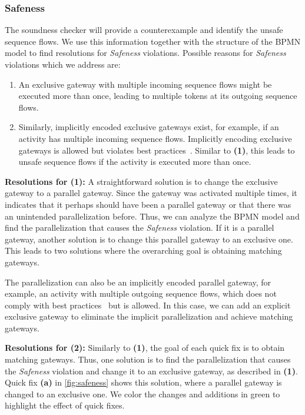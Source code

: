 \documentclass[runningheads]{llncs}
\begin{document}
\subsubsection{Safeness}
The soundness checker will provide a counterexample and identify the unsafe sequence flows.
We use this information together with the structure of the BPMN model to find resolutions for \textit{Safeness} violations.
Possible reasons for \textit{Safeness} violations which we address are:

\begin{enumerate}
	\item An exclusive gateway with multiple incoming sequence flows might be executed more than once, leading to multiple tokens at its outgoing sequence flows.
	\item Similarly, implicitly encoded exclusive gateways exist, for example, if an activity has multiple incoming sequence flows.
	Implicitly encoding exclusive gateways is allowed but violates best practices~\cite{camundaservicesgmbhBpmnlint2024}.
	Similar to \textbf{(1)}, this leads to unsafe sequence flows if the activity is executed more than once.
\end{enumerate}


\textbf{Resolutions for (1):} A straightforward solution is to change the exclusive gateway to a parallel gateway.
Since the gateway was activated multiple times, it indicates that it perhaps should have been a parallel gateway or that there was an unintended parallelization before.
Thus, we can analyze the BPMN model and find the parallelization that causes the \textit{Safeness} violation.
If it is a parallel gateway, another solution is to change this parallel gateway to an exclusive one.
This leads to two solutions where the overarching goal is obtaining matching gateways.

The parallelization can also be an implicitly encoded parallel gateway, for example, an activity with multiple outgoing sequence flows, which does not comply with best practices~\cite{camundaservicesgmbhBpmnlint2024} but is allowed.
In this case, we can add an explicit exclusive gateway to eliminate the implicit parallelization and achieve matching gateways.

\textbf{Resolutions for (2):} Similarly to \textbf{(1)}, the goal of each quick fix is to obtain matching gateways.
Thus, one solution is to find the parallelization that causes the \textit{Safeness} violation and change it to an exclusive gateway, as described in \textbf{(1)}.
Quick fix \textbf{(a)} in \autoref{fig:safeness} shows this solution, where a parallel gateway is changed to an exclusive one.
We color the changes and additions in green to highlight the effect of quick fixes.
\end{document}
